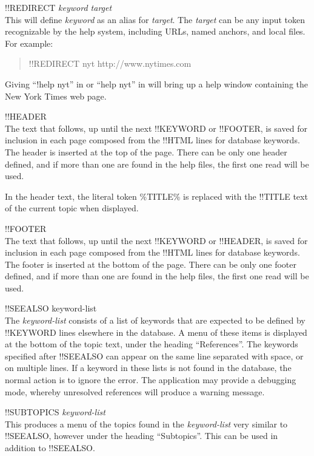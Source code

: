 \begin{description}
\item{\vt !!REDIRECT {\it keyword target}}\\
This will define {\it keyword} as an alias for {\it target}.  The {\it
target} can be any input token recognizable by the help system,
including URLs, named anchors, and local files.  For example:
\begin{quote}
{\vt !!REDIRECT nyt http://www.nytimes.com}
\end{quote}
Giving ``{\vt !help nyt}'' in {\Xic} or ``{\vt help nyt}'' in
{\WRspice} will bring up a help window containing the New York Times
web page.

\item{\vt !!HEADER}\\
The text that follows, up until the next {\vt !!KEYWORD} or {\vt
!!FOOTER}, is saved for inclusion in each page composed from the {\vt
!!HTML} lines for database keywords.  The header is inserted at the
top of the page.  There can be only one header defined, and if more
than one are found in the help files, the first one read will be used.

In the header text, the literal token {\vt \%TITLE\%} is replaced with
the {\vt !!TITLE} text of the current topic when displayed.

\item{\vt !!FOOTER}\\
The text that follows, up until the next {\vt !!KEYWORD} or {\vt
!!HEADER}, is saved for inclusion in each page composed from the {\vt
!!HTML} lines for database keywords.  The footer is inserted at the
bottom of the page.  There can be only one footer defined, and if more
than one are found in the help files, the first one read will be used.

\item{\vt !!SEEALSO {\vt keyword-list}}\\
The {\it keyword-list} consists of a list of keywords that are
expected to be defined by {\vt !!KEYWORD} lines elsewhere in the
database.  A menu of these items is displayed at the bottom of the
topic text, under the heading ``References''.  The keywords specified
after {\vt !!SEEALSO} can appear on the same line separated with
space, or on multiple lines.  If a keyword in these lists is not found
in the database, the normal action is to ignore the error.  The
application may provide a debugging mode, whereby unresolved
references will produce a warning message.

\item{\vt !!SUBTOPICS {\it keyword-list}}\\
This produces a menu of the topics found in the {\it keyword-list}
very similar to {\vt !!SEEALSO}, however under the heading
``Subtopics''.  This can be used in addition to {\vt !!SEEALSO}.
\end{description}

